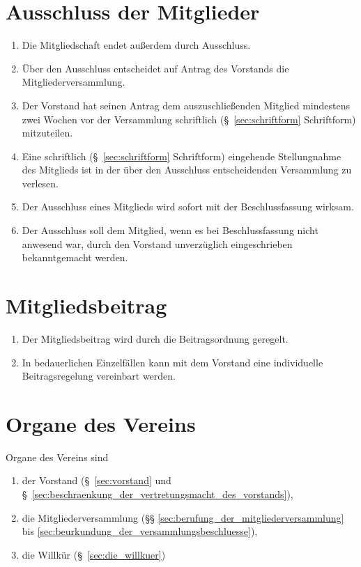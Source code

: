 \documentclass[a4paper]{article}
\begin{document}
\section{Ausschluss der Mitglieder}\label{sec:ausschluss_der_mitglieder}

\begin{enumerate}
\item Die Mitgliedschaft endet außerdem durch Ausschluss.
\item Über den Ausschluss entscheidet auf Antrag des Vorstands die Mitgliederversammlung.
\item Der Vorstand hat seinen Antrag dem auszuschließenden Mitglied mindestens zwei Wochen vor der Versammlung schriftlich (§~\ref{sec:schriftform} Schriftform) mitzuteilen.
\item Eine schriftlich (§~\ref{sec:schriftform} Schriftform) eingehende Stellungnahme des Mitglieds ist in der über den Ausschluss entscheidenden Versammlung zu verlesen.
\item Der Ausschluss eines Mitglieds wird sofort mit der Beschlussfassung wirksam.
\item Der Ausschluss soll dem Mitglied, wenn es bei Beschlussfassung nicht anwesend war, durch den Vorstand unverzüglich eingeschrieben bekanntgemacht werden.
\end{enumerate}


\section{Mitgliedsbeitrag}\label{sec:mitgliedsbeitrag}

\begin{enumerate}
\item Der Mitgliedsbeitrag wird durch die Beitragsordnung geregelt.
\item In bedauerlichen Einzelfällen kann mit dem Vorstand eine individuelle Beitragsregelung vereinbart werden.
\end{enumerate}


\section{Organe des Vereins}\label{sec:organe_des_vereins}

Organe des Vereins sind
\begin{enumerate}
\item der Vorstand (§~\ref{sec:vorstand} und §~\ref{sec:beschraenkung_der_vertretungsmacht_des_vorstands}),
\item die Mitgliederversammlung (§§ \ref{sec:berufung_der_mitgliederversammlung} bis \ref{sec:beurkundung_der_versammlungsbeschluesse}),
\item die Willkür (§~\ref{sec:die_willkuer})
\end{enumerate}
\end{document}
